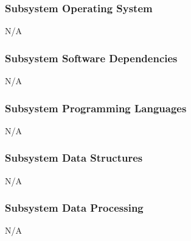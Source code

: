 \subsubsection{Subsystem Operating System}
N/A

\subsubsection{Subsystem Software Dependencies}
N/A

\subsubsection{Subsystem Programming Languages}
N/A

\subsubsection{Subsystem Data Structures}
N/A

\subsubsection{Subsystem Data Processing}
N/A


